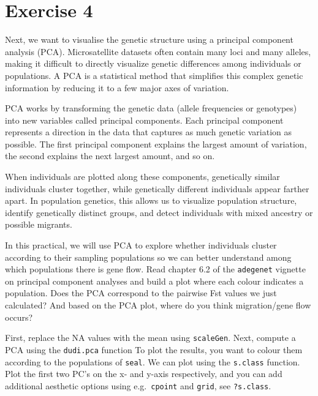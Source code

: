 \documentclass[
  letterpaper,
  DIV=11,
  numbers=noendperiod]{scrreprt}
\begin{document}
\section{Exercise 4}\label{exercise-4}

Next, we want to visualise the genetic structure using a principal
component analysis (PCA). Microsatellite datasets often contain many
loci and many alleles, making it difficult to directly visualize genetic
differences among individuals or populations. A PCA is a statistical
method that simplifies this complex genetic information by reducing it
to a few major axes of variation.

PCA works by transforming the genetic data (allele frequencies or
genotypes) into new variables called principal components. Each
principal component represents a direction in the data that captures as
much genetic variation as possible. The first principal component
explains the largest amount of variation, the second explains the next
largest amount, and so on.

When individuals are plotted along these components, genetically similar
individuals cluster together, while genetically different individuals
appear farther apart. In population genetics, this allows us to
visualize population structure, identify genetically distinct groups,
and detect individuals with mixed ancestry or possible migrants.

In this practical, we will use PCA to explore whether individuals
cluster according to their sampling populations so we can better
understand among which populations there is gene flow. Read chapter 6.2
of the \texttt{adegenet} vignette on principal component analyses and
build a plot where each colour indicates a population. Does the PCA
correspond to the pairwise Fst values we just calculated? And based on
the PCA plot, where do you think migration/gene flow occurs?

\begin{tcolorbox}[enhanced jigsaw, arc=.35mm, left=2mm, titlerule=0mm, rightrule=.15mm, colframe=quarto-callout-tip-color-frame, coltitle=black, colback=white, opacityback=0, bottomtitle=1mm, bottomrule=.15mm, colbacktitle=quarto-callout-tip-color!10!white, breakable, title=\textcolor{quarto-callout-tip-color}{\faLightbulb}\hspace{0.5em}{Tips}, toptitle=1mm, toprule=.15mm, opacitybacktitle=0.6, leftrule=.75mm]

First, replace the NA values with the mean using \texttt{scaleGen}.
Next, compute a PCA using the \texttt{dudi.pca} function To plot the
results, you want to colour them according to the populations of
\texttt{seal}. We can plot using the \texttt{s.class} function. Plot the
first two PC's on the x- and y-axis respectively, and you can add
additional aesthetic options using e.g.~\texttt{cpoint} and
\texttt{grid}, see \texttt{?s.class}.

\end{tcolorbox}
\end{document}
